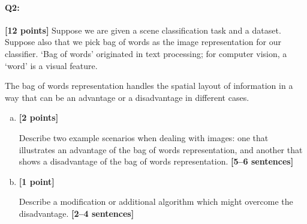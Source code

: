 \pagebreak
\paragraph{Q2:} \textbf{[12 points]} Suppose we are given a scene classification task and a dataset. Suppose also that we pick bag of words as the image representation for our classifier. `Bag of words' originated in text processing; for computer vision, a `word' is a visual feature.

The bag of words representation handles the spatial layout of information in a way that can be an advantage or a disadvantage in different cases.

\begin{enumerate}[(a)]

\item \textbf{[2 points]} 
\begin{tcolorbox}[colback=orange!5!white,colframe=orange!75!black]
     Describe two example scenarios when dealing with images: one that illustrates an advantage of the bag of words representation, and another that shows a disadvantage of the bag of words representation. \textbf{[5--6 sentences]}
\end{tcolorbox}


\item \textbf{[1 point]}
\begin{tcolorbox}[colback=orange!5!white,colframe=orange!75!black]
      Describe a modification or additional algorithm which might overcome the disadvantage. \textbf{[2--4 sentences]}
\end{tcolorbox}


\end{enumerate}

